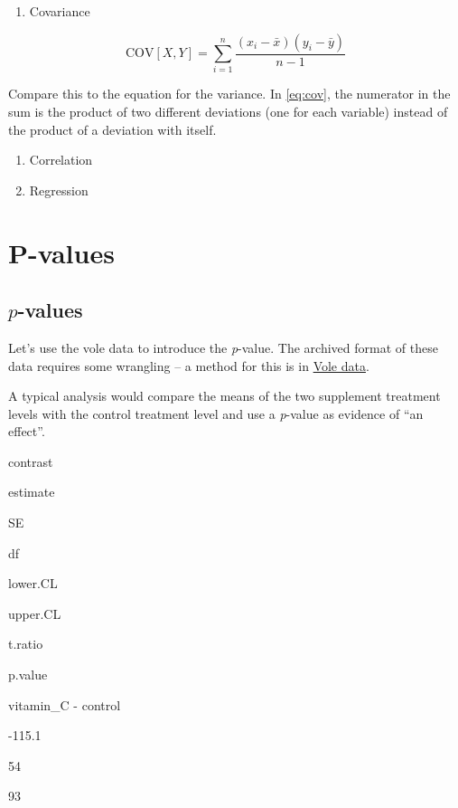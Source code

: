 \documentclass[]{book}
\providecommand{\tightlist}{%
  \setlength{\itemsep}{0pt}\setlength{\parskip}{0pt}}
\begin{document}
\begin{enumerate}
\def\labelenumi{\arabic{enumi}.}
\tightlist
\item
  Covariance
\end{enumerate}

\begin{equation}
\mathrm{COV}[X, Y] = \sum_{i=1}^n{\frac{(x_i - \bar{x})(y_i - \bar{y})}{n-1}}
\label{eq:cov}
\end{equation}

Compare this to the equation for the variance. In \eqref{eq:cov}, the
numerator in the sum is the product of two different deviations (one for
each variable) instead of the product of a deviation with itself.

\begin{enumerate}
\def\labelenumi{\arabic{enumi}.}
\setcounter{enumi}{1}
\item
  Correlation
\item
  Regression
\end{enumerate}

\chapter{P-values}\label{p-values}

\section{\texorpdfstring{\(p\)-values}{p-values}}\label{p-values-1}

Let's use the vole data to introduce the \emph{p}-value. The archived
format of these data requires some wrangling -- a method for this is in
\protect\hyperlink{vole-data}{Vole data}.

A typical analysis would compare the means of the two supplement
treatment levels with the control treatment level and use a
\emph{p}-value as evidence of ``an effect''.

contrast

estimate

SE

df

lower.CL

upper.CL

t.ratio

p.value

vitamin\_C - control

-115.1

54

93
\end{document}
